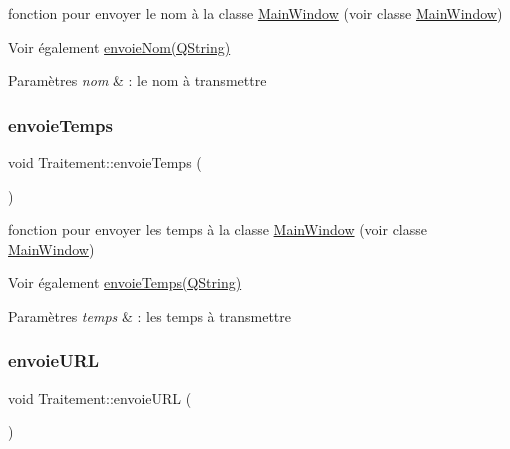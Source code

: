 fonction pour envoyer le nom à la classe \hyperlink{classMainWindow}{Main\+Window} (voir classe \hyperlink{classMainWindow}{Main\+Window}) 

\begin{DoxySeeAlso}{Voir également}
\hyperlink{classTraitement_ab958dbb923cb1b905c260c4f54907169}{envoie\+Nom(\+Q\+String)} 
\end{DoxySeeAlso}

\begin{DoxyParams}{Paramètres}
{\em nom} & \+: le nom à transmettre \\
\hline
\end{DoxyParams}
\mbox{\label{classTraitement_ae57543af34e05b74a7af460c0e74e87f}} 
\subsubsection{\texorpdfstring{envoie\+Temps}{envoieTemps}}
{\footnotesize\ttfamily void Traitement\+::envoie\+Temps (\begin{DoxyParamCaption}\item[{Q\+String}]{ }\end{DoxyParamCaption})\hspace{0.3cm}{\ttfamily [signal]}}



fonction pour envoyer les temps à la classe \hyperlink{classMainWindow}{Main\+Window} (voir classe \hyperlink{classMainWindow}{Main\+Window}) 

\begin{DoxySeeAlso}{Voir également}
\hyperlink{classTraitement_ae57543af34e05b74a7af460c0e74e87f}{envoie\+Temps(\+Q\+String)} 
\end{DoxySeeAlso}

\begin{DoxyParams}{Paramètres}
{\em temps} & \+: les temps à transmettre \\
\hline
\end{DoxyParams}
\mbox{\label{classTraitement_acc099bf1113669c2e061e8897c3eaeca}} 
\subsubsection{\texorpdfstring{envoie\+U\+RL}{envoieURL}}
{\footnotesize\ttfamily void Traitement\+::envoie\+U\+RL (\begin{DoxyParamCaption}\item[{Q\+String}]{ }\end{DoxyParamCaption})\hspace{0.3cm}{\ttfamily [signal]}}




